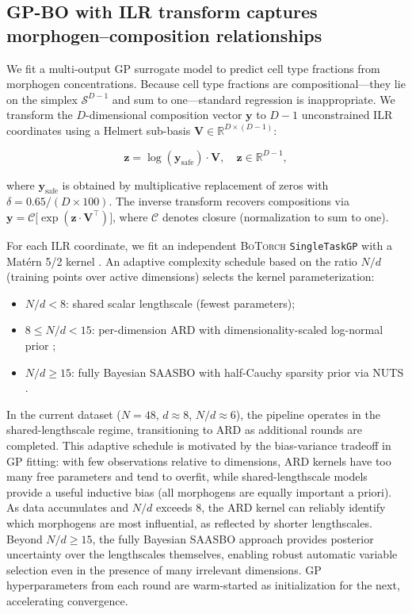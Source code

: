 \documentclass[times,twoside]{zHenriquesLab-StyleBioRxiv}
\newcommand{\botorch}{\textsc{BoTorch}}
\newcommand{\Real}{\mathbb{R}}
\newcommand{\simplex}{\mathcal{S}}
\begin{document}
\subsection*{GP-BO with ILR transform captures morphogen--composition relationships}

We fit a multi-output GP surrogate model to predict cell type fractions from morphogen concentrations. Because cell type fractions are compositional---they lie on the simplex $\simplex^{D-1}$ and sum to one---standard regression is inappropriate. We transform the $D$-dimensional composition vector $\bm{y}$ to $D{-}1$ unconstrained ILR coordinates using a Helmert sub-basis $\bm{V} \in \Real^{D \times (D-1)}$:

\begin{equation}
  \bm{z} = \log(\bm{y}_\text{safe}) \cdot \bm{V}, \quad \bm{z} \in \Real^{D-1},
\end{equation}

where $\bm{y}_\text{safe}$ is obtained by multiplicative replacement of zeros \cite{MartinFernandez2015} with $\delta = 0.65 / (D \times 100)$. The inverse transform recovers compositions via $\bm{y} = \mathcal{C}\!\bigl[\exp(\bm{z} \cdot \bm{V}^\top)\bigr]$, where $\mathcal{C}$ denotes closure (normalization to sum to one).

For each ILR coordinate, we fit an independent \botorch{} \texttt{SingleTaskGP} with a Mat\'{e}rn 5/2 kernel \cite{Balandat2020botorch}. An adaptive complexity schedule based on the ratio $N/d$ (training points over active dimensions) selects the kernel parameterization:

\begin{itemize}[nosep,leftmargin=*]
  \item $N/d < 8$: shared scalar lengthscale (fewest parameters);
  \item $8 \leq N/d < 15$: per-dimension ARD with dimensionality-scaled log-normal prior \cite{Hvarfner2024};
  \item $N/d \geq 15$: fully Bayesian SAASBO with half-Cauchy sparsity prior via NUTS \cite{Eriksson2021saasbo}.
\end{itemize}

In the current dataset ($N{=}48$, $d{\approx}8$, $N/d{\approx}6$), the pipeline operates in the shared-lengthscale regime, transitioning to ARD as additional rounds are completed. This adaptive schedule is motivated by the bias-variance tradeoff in GP fitting: with few observations relative to dimensions, ARD kernels have too many free parameters and tend to overfit, while shared-lengthscale models provide a useful inductive bias (all morphogens are equally important a priori). As data accumulates and $N/d$ exceeds 8, the ARD kernel can reliably identify which morphogens are most influential, as reflected by shorter lengthscales. Beyond $N/d \geq 15$, the fully Bayesian SAASBO approach provides posterior uncertainty over the lengthscales themselves, enabling robust automatic variable selection even in the presence of many irrelevant dimensions. GP hyperparameters from each round are warm-started as initialization for the next, accelerating convergence.
\end{document}
